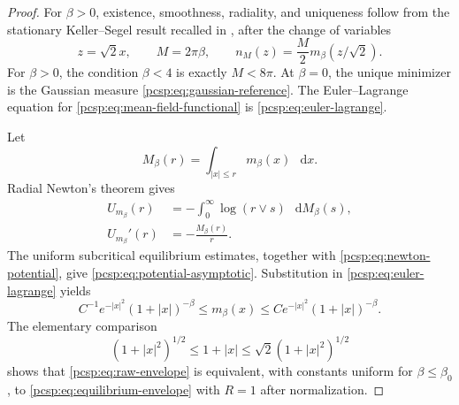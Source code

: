\documentclass[11pt,reqno]{amsart}
\numberwithin{equation}{section}
\theoremstyle{plain}
\theoremstyle{definition}
\newcommand{\dd}{\mathop{}\!\mathrm d}
\newcommand{\be}{\beta}
\begin{document}
\begin{proof}
For $\be>0$, existence, smoothness, radiality, and uniqueness follow from the stationary Keller--Segel result recalled in \cite[Section~1, equation~(1.10)]{CamposDolbeault2014}, after the change of variables
\begin{equation}\label{pcsp:eq:KS-scaling}
 z=\sqrt2x,
 \qquad
 M=2\pi\be,
 \qquad
 n_M(z)=\frac M2m_\be(z/\sqrt2).
\end{equation}
For $\be>0$, the condition $\be<4$ is exactly $M<8\pi$. At $\be=0$, the unique minimizer is the Gaussian measure \eqref{pcsp:eq:gaussian-reference}. The Euler--Lagrange equation for \eqref{pcsp:eq:mean-field-functional} is \eqref{pcsp:eq:euler-lagrange}.

Let
\begin{equation}\label{pcsp:eq:radial-distribution}
 M_\be(r)=\int_{|x|\leq r}m_\be(x)\,\dd x.
\end{equation}
Radial Newton's theorem gives
\begin{align}
 U_{m_\be}(r)
 &=-\int_0^\infty\log(r\vee s)\,\dd M_\be(s),
 \label{pcsp:eq:newton-potential}\\
 U_{m_\be}'(r)&=-\frac{M_\be(r)}r.
 \label{pcsp:eq:newton-derivative}
\end{align}
The uniform subcritical equilibrium estimates, together with \eqref{pcsp:eq:newton-potential}, give \eqref{pcsp:eq:potential-asymptotic}.  Substitution in \eqref{pcsp:eq:euler-lagrange} yields
\begin{equation}\label{pcsp:eq:raw-envelope}
 C^{-1}e^{-|x|^2}(1+|x|)^{-\be}
 \leq m_\be(x)
 \leq Ce^{-|x|^2}(1+|x|)^{-\be}.
\end{equation}
The elementary comparison
\begin{equation}\label{pcsp:eq:weight-comparison}
 (1+|x|^2)^{1/2}\leq1+|x|
 \leq\sqrt2(1+|x|^2)^{1/2}
\end{equation}
shows that \eqref{pcsp:eq:raw-envelope} is equivalent, with constants uniform for $\be\leq\be_0$, to \eqref{pcsp:eq:equilibrium-envelope} with $R=1$ after normalization.


\end{proof}
\end{document}
